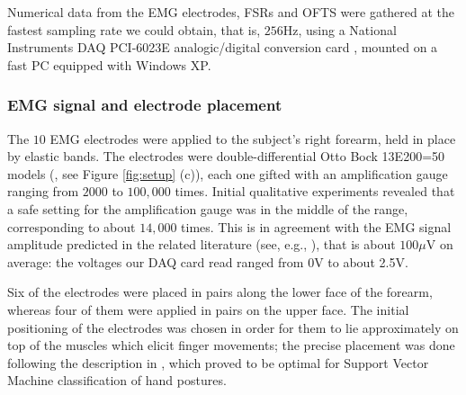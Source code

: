 Numerical data from the EMG electrodes, FSRs and OFTS were gathered at
the fastest sampling rate we could obtain, that is, $256$Hz, using a
National Instruments DAQ PCI-6023E analogic/digital conversion card
\cite{nidaq}, mounted on a fast PC equipped with Windows XP.

\subsubsection{EMG signal and electrode placement}
\label{subsubsec:electrodes}

The $10$ EMG electrodes were applied to the subject's right forearm,
held in place by elastic bands. The electrodes were
double-differential Otto Bock 13E200=50 models (\cite{ottobock}, see
Figure \ref{fig:setup} (c)), each one gifted with an amplification
gauge ranging from $2000$ to $100,000$ times. Initial qualitative
experiments revealed that a safe setting for the amplification gauge
was in the middle of the range, corresponding to about $14,000$
times. This is in agreement with the EMG signal amplitude predicted in
the related literature (see, e.g., \cite{deluca}), that is about $100
\mu$V on average: the voltages our DAQ card read ranged from 0V to
about 2.5V.

Six of the electrodes were placed in pairs along the lower face of the
forearm, whereas four of them were applied in pairs on the upper
face. The initial positioning of the electrodes was chosen in order
for them to lie approximately on top of the muscles which elicit
finger movements; the precise placement was done following the
description in \cite{smagt}, which proved to be optimal for Support
Vector Machine classification of hand postures.

